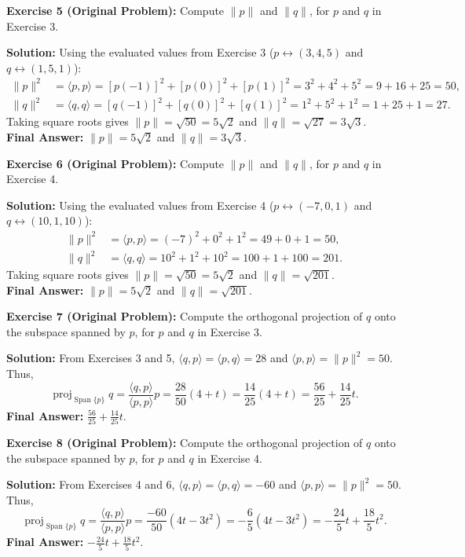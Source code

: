 \documentclass[11pt, letterpaper]{article}
\theoremstyle{definition}
\theoremstyle{remark}
\begin{document}
\textbf{Exercise 5 (Original Problem):} Compute $\|p\|$ and $\|q\|$, for $p$ and $q$ in Exercise 3.

\textbf{Solution:}
Using the evaluated values from Exercise 3 ($p \leftrightarrow (3, 4, 5)$ and $q \leftrightarrow (1, 5, 1)$):
\begin{align*}
    \|p\|^2 &= \langle p, p \rangle = [p(-1)]^2 + [p(0)]^2 + [p(1)]^2 = 3^2 + 4^2 + 5^2 = 9 + 16 + 25 = 50, \\
    \|q\|^2 &= \langle q, q \rangle = [q(-1)]^2 + [q(0)]^2 + [q(1)]^2 = 1^2 + 5^2 + 1^2 = 1 + 25 + 1 = 27.
\end{align*}
Taking square roots gives $\|p\| = \sqrt{50} = 5\sqrt{2}$ and $\|q\| = \sqrt{27} = 3\sqrt{3}$.\\
\textbf{Final Answer:} $\|p\| = 5\sqrt{2}$ and $\|q\| = 3\sqrt{3}$.

\textbf{Exercise 6 (Original Problem):} Compute $\|p\|$ and $\|q\|$, for $p$ and $q$ in Exercise 4.

\textbf{Solution:}
Using the evaluated values from Exercise 4 ($p \leftrightarrow (-7, 0, 1)$ and $q \leftrightarrow (10, 1, 10)$):
\begin{align*}
    \|p\|^2 &= \langle p, p \rangle = (-7)^2 + 0^2 + 1^2 = 49 + 0 + 1 = 50, \\
    \|q\|^2 &= \langle q, q \rangle = 10^2 + 1^2 + 10^2 = 100 + 1 + 100 = 201.
\end{align*}
Taking square roots gives $\|p\| = \sqrt{50} = 5\sqrt{2}$ and $\|q\| = \sqrt{201}$.\\
\textbf{Final Answer:} $\|p\| = 5\sqrt{2}$ and $\|q\| = \sqrt{201}$.

\textbf{Exercise 7 (Original Problem):} Compute the orthogonal projection of $q$ onto the subspace spanned by $p$, for $p$ and $q$ in Exercise 3.

\textbf{Solution:}
From Exercises 3 and 5, $\langle q, p \rangle = \langle p, q \rangle = 28$ and $\langle p, p \rangle = \|p\|^2 = 50$. Thus,
\[
    \operatorname{proj}_{\operatorname{Span}\{p\}} q = \frac{\langle q, p \rangle}{\langle p, p \rangle} p = \frac{28}{50}(4 + t) = \frac{14}{25}(4 + t) = \frac{56}{25} + \frac{14}{25}t.
\]
\textbf{Final Answer:} $\displaystyle \frac{56}{25} + \frac{14}{25}t$.

\textbf{Exercise 8 (Original Problem):} Compute the orthogonal projection of $q$ onto the subspace spanned by $p$, for $p$ and $q$ in Exercise 4.

\textbf{Solution:}
From Exercises 4 and 6, $\langle q, p \rangle = \langle p, q \rangle = -60$ and $\langle p, p \rangle = \|p\|^2 = 50$. Thus,
\[
    \operatorname{proj}_{\operatorname{Span}\{p\}} q = \frac{\langle q, p \rangle}{\langle p, p \rangle} p = \frac{-60}{50}(4t - 3t^2) = -\frac{6}{5}(4t - 3t^2) = -\frac{24}{5}t + \frac{18}{5}t^2.
\]
\textbf{Final Answer:} $\displaystyle -\frac{24}{5}t + \frac{18}{5}t^2$.
\end{document}
